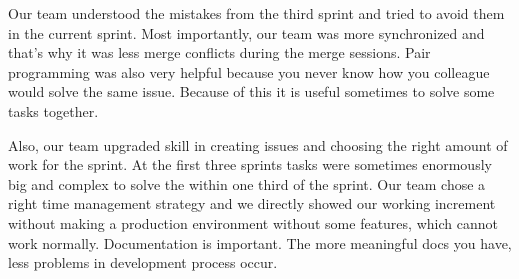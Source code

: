 Our team understood the mistakes from the third sprint and tried to avoid them in the current sprint. Most importantly, our team was more synchronized and that’s why it was less merge conflicts during the merge sessions. Pair programming was also very helpful because you never know how you colleague would solve the same issue. Because of this it is useful sometimes to solve some tasks together. 

Also, our team upgraded skill in creating issues and choosing the right amount of work for the sprint. At the first three sprints tasks were sometimes enormously big and complex to solve the within one third of the sprint. Our team chose a right time management strategy and we directly showed our working increment without making a production environment without some features, which cannot work normally. Documentation is important. The more meaningful docs you have, less problems in development process occur.